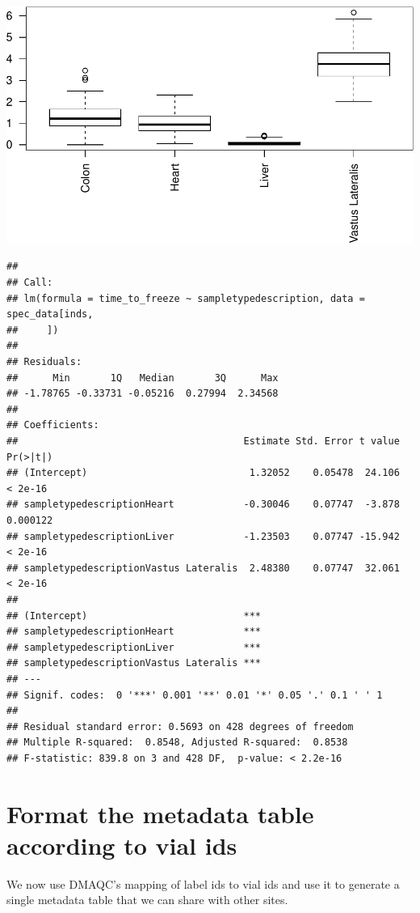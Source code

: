 \documentclass[]{article}
\begin{document}
\includegraphics[width=0.5\linewidth,height=0.5\textheight]{pheno_csv_files_analysis_files/figure-latex/unnamed-chunk-5-2}

\begin{verbatim}
## 
## Call:
## lm(formula = time_to_freeze ~ sampletypedescription, data = spec_data[inds, 
##     ])
## 
## Residuals:
##      Min       1Q   Median       3Q      Max 
## -1.78765 -0.33731 -0.05216  0.27994  2.34568 
## 
## Coefficients:
##                                       Estimate Std. Error t value Pr(>|t|)
## (Intercept)                            1.32052    0.05478  24.106  < 2e-16
## sampletypedescriptionHeart            -0.30046    0.07747  -3.878 0.000122
## sampletypedescriptionLiver            -1.23503    0.07747 -15.942  < 2e-16
## sampletypedescriptionVastus Lateralis  2.48380    0.07747  32.061  < 2e-16
##                                          
## (Intercept)                           ***
## sampletypedescriptionHeart            ***
## sampletypedescriptionLiver            ***
## sampletypedescriptionVastus Lateralis ***
## ---
## Signif. codes:  0 '***' 0.001 '**' 0.01 '*' 0.05 '.' 0.1 ' ' 1
## 
## Residual standard error: 0.5693 on 428 degrees of freedom
## Multiple R-squared:  0.8548, Adjusted R-squared:  0.8538 
## F-statistic: 839.8 on 3 and 428 DF,  p-value: < 2.2e-16
\end{verbatim}

\section{Format the metadata table according to vial
ids}\label{format-the-metadata-table-according-to-vial-ids}

We now use DMAQC's mapping of label ids to vial ids and use it to
generate a single metadata table that we can share with other sites.
\end{document}
